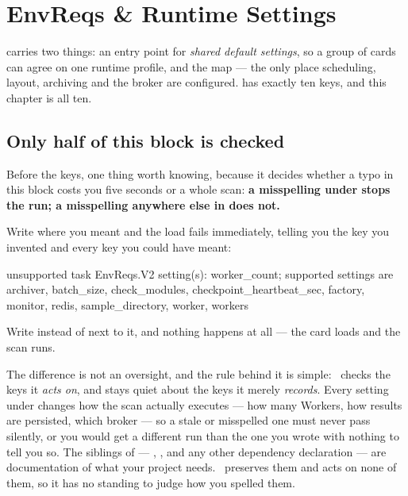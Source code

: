 \chapter{EnvReqs \& Runtime Settings}
\label{ch:envreqs}

  carries two things: an
entry point for \emph{shared default settings}, so a group of cards can agree on one
runtime profile, and the  map --- the only place scheduling, 
layout, archiving and the broker are configured.  has exactly ten keys, and
this chapter is all ten.

\section{Only half of this block is checked}
\label{sec:envreqs-zone}

Before the keys, one thing worth knowing, because it decides whether a typo in this block
costs you five seconds or a whole scan: \textbf{a misspelling under  stops the
run; a misspelling anywhere else in  does not.}

Write  where you meant  and the load fails
immediately, telling you the key you invented and every key you could have meant:

\begin{terminal}
\begin{jout}
unsupported task EnvReqs.V2 setting(s): worker_count;
supported settings are archiver, batch_size, check_modules,
checkpoint_heartbeat_sec, factory, monitor, redis, sample_directory,
worker, workers
\end{jout}
\end{terminal}

Write  instead of  next to it, and nothing happens at
all --- the card loads and the scan runs.

The difference is not an oversight, and the rule behind it is simple: \Jtwo\ checks the
keys it \emph{acts on}, and stays quiet about the keys it merely \emph{records}. Every
setting under  changes how the scan actually executes --- how many Workers,
how results are persisted, which broker --- so a stale or misspelled one must never pass
silently, or you would get a different run than the one you wrote with nothing to tell you
so. The siblings of  --- , ,
 and any other dependency declaration --- are documentation of what
your project needs. \Jtwo\ preserves them and acts on none of them, so it has no standing
to judge how you spelled them.

